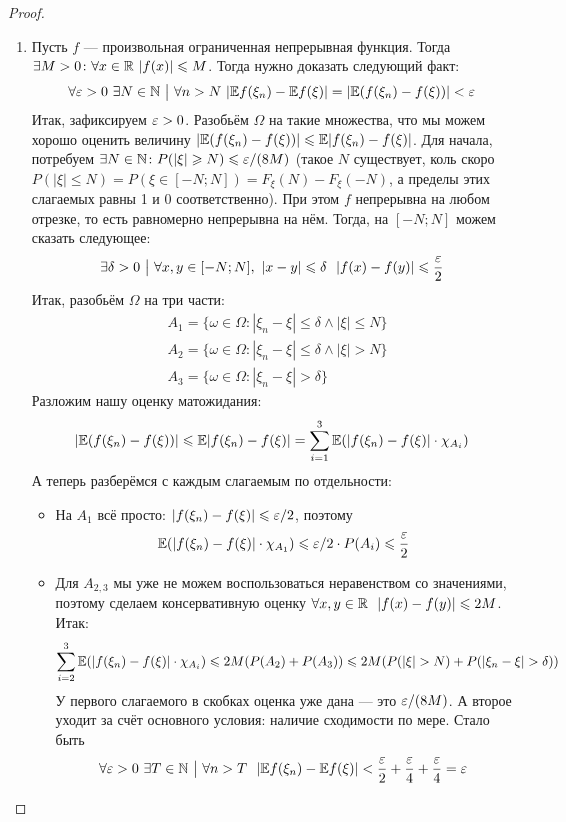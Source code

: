 \begin{proof}
\begin{enumerate}
		\item Пусть $f$ --- произвольная ограниченная непрерывная функция. Тогда $\exists M > 0 \colon \forall x \in \mathbb{R}\ |f(x)| \leqslant M$. Тогда нужно доказать следующий факт:
		\[
			\forall \varepsilon > 0\ \exists N \in \mathbb{N} \ \big|\  \forall n > N\ |\mathbb{E} f(\xi_n) - \mathbb{E} f(\xi)| = |\mathbb{E}(f(\xi_n) - f(\xi))| < \varepsilon
		\]
		Итак, зафиксируем $\varepsilon > 0$. Разобьём $\Omega$ на такие множества, что мы можем хорошо оценить величину $|\mathbb{E}(f(\xi_n) - f(\xi))| \leqslant \mathbb{E}|f(\xi_n) - f(\xi)|$. Для начала, потребуем $\exists N \in \mathbb{N} \colon P(|\xi| \geqslant N) \leqslant \varepsilon / (8M)$ (такое $N$ существует, коль скоро $P(|\xi| \le N) = P(\xi \in [-N; N]) = F_\xi(N) - F_\xi(-N)$, а пределы этих слагаемых равны 1 и 0 соответственно). При этом $f$ непрерывна на любом отрезке, то есть равномерно непрерывна на нём. Тогда, на $[-N; N]$ можем сказать следующее:
		\[
			\exists \delta > 0 \ \big|\  \forall x, y \in [-N; N],\ |x - y| \leqslant \delta\ \ |f(x) - f(y)| \leqslant \frac{\varepsilon}{2}
		\]
		Итак, разобьём $\Omega$ на три части:
		\begin{align*}
			&{A_1 = \{\omega \in \Omega \colon |\xi_n - \xi| \le \delta \wedge |\xi| \le N\}}
			\\
			&{A_2 = \{\omega \in \Omega \colon |\xi_n - \xi| \le \delta \wedge |\xi| > N\}}
			\\
			&{A_3 = \{\omega \in \Omega \colon |\xi_n - \xi| > \delta\}}
		\end{align*}
		Разложим нашу оценку матожидания:
		\[
			|\mathbb{E} (f(\xi_n) - f(\xi))| \leqslant \mathbb{E}|f(\xi_n) - f(\xi)| = \sum_{i = 1}^3 \mathbb{E}(|f(\xi_n) - f(\xi)| \cdot \chi_{A_i})
		\]
		А теперь разберёмся с каждым слагаемым по отдельности:
		\begin{itemize}
			\item На $A_1$ всё просто: $|f(\xi_n) - f(\xi)| \leqslant \varepsilon / 2$, поэтому
			\[
				\mathbb{E}(|f(\xi_n) - f(\xi)| \cdot \chi_{A_1}) \leqslant \varepsilon / 2 \cdot P(A_i) \leqslant \frac{\varepsilon}{2}
			\]
			
			\item Для $A_{2, 3}$ мы уже не можем воспользоваться неравенством со значениями, поэтому сделаем консервативную оценку $\forall x, y \in \mathbb{R}\ \ |f(x) - f(y)| \leqslant 2M$. Итак:
			\[
				\sum_{i = 2}^3 \mathbb{E}(|f(\xi_n) - f(\xi)| \cdot \chi_{A_i}) \leqslant 2M(P(A_2) + P(A_3)) \leqslant 2M(P(|\xi| > N) + P(|\xi_n - \xi| > \delta))
			\]
			У первого слагаемого в скобках оценка уже дана --- это $\varepsilon / (8M)$. А второе уходит за счёт основного условия: наличие сходимости по мере. Стало быть
			\[
				\forall \varepsilon > 0\ \exists T \in \mathbb{N} \ \big|\  \forall n > T\ \ |\mathbb{E} f(\xi_n) - \mathbb{E} f(\xi)| < \frac{\varepsilon}{2} + \frac{\varepsilon}{4} + \frac{\varepsilon}{4} = \varepsilon
			\]
		\end{itemize}
	\end{enumerate}
\end{proof}


